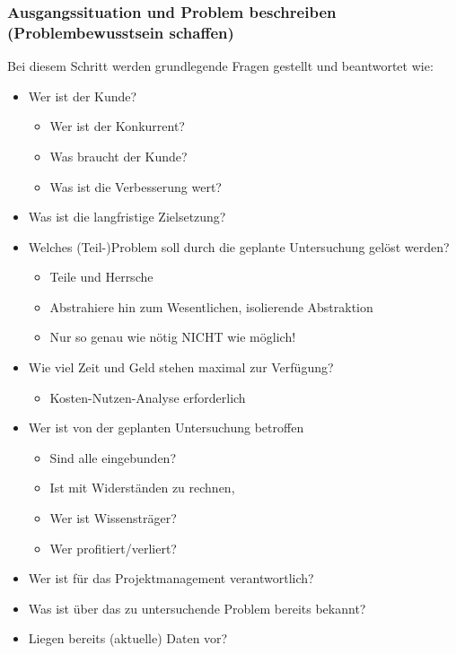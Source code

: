 \subsubsection{Ausgangssituation und Problem beschreiben (Problembewusstsein schaffen)}
Bei diesem Schritt werden grundlegende Fragen gestellt und beantwortet wie:
\begin{itemize}
    \item Wer ist der Kunde? 
    \begin{itemize}
        \item Wer ist der Konkurrent?  
        \item Was braucht der Kunde? 
        \item Was ist die Verbesserung wert? 
    \end{itemize}
    \item Was ist die langfristige Zielsetzung? 
    \item Welches (Teil-)Problem soll durch die geplante Untersuchung gelöst werden? 
    \begin{itemize}
        \item Teile und Herrsche
        \item Abstrahiere hin zum Wesentlichen, isolierende Abstraktion
        \item Nur so genau wie nötig NICHT wie möglich! 
    \end{itemize}
    \item Wie viel Zeit und Geld stehen maximal zur Verfügung? 
    \begin{itemize}
        \item Kosten-Nutzen-Analyse erforderlich
    \end{itemize}
    \item Wer ist von der geplanten Untersuchung betroffen 
    \begin{itemize}
        \item Sind alle eingebunden? 
        \item Ist mit Widerständen zu rechnen, 
        \item Wer ist Wissensträger?
        \item Wer profitiert/verliert? 
    \end{itemize}
    \item Wer ist für das Projektmanagement verantwortlich?
    \item Was ist über das zu untersuchende Problem bereits bekannt? 
    \item Liegen bereits (aktuelle) Daten vor? 
\end{itemize}

